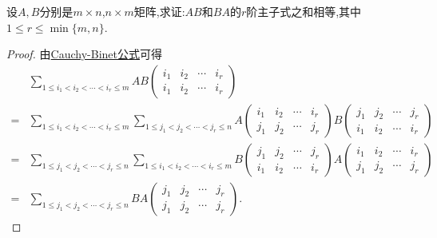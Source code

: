 \documentclass[../../main.tex]{subfiles}%
\begin{document}
\begin{example}
设\(A,B\)分别是\(m\times n\),\(n\times m\)矩阵,求证:\(AB\)和\(BA\)的\(r\)阶主子式之和相等,其中\(1\leqslant  r\leqslant \min\{m,n\}\).
\end{example}
\begin{proof}
由\hyperref[theorem:Cauchy-Binet公式]{Cauchy-Binet公式}可得
\begin{align*}
&\sum_{1\leqslant  i_1 < i_2 < \cdots < i_r\leqslant  m}AB\begin{pmatrix}
i_1 & i_2 & \cdots & i_r\\
i_1 & i_2 & \cdots & i_r
\end{pmatrix}\\
=&\sum_{1\leqslant  i_1 < i_2 < \cdots < i_r\leqslant  m}\sum_{1\leqslant  j_1 < j_2 < \cdots < j_r\leqslant  n}A\begin{pmatrix}
i_1 & i_2 & \cdots & i_r\\
j_1 & j_2 & \cdots & j_r
\end{pmatrix}B\begin{pmatrix}
j_1 & j_2 & \cdots & j_r\\
i_1 & i_2 & \cdots & i_r
\end{pmatrix}\\
=&\sum_{1\leqslant  j_1 < j_2 < \cdots < j_r\leqslant  n}\sum_{1\leqslant  i_1 < i_2 < \cdots < i_r\leqslant  m}B\begin{pmatrix}
j_1 & j_2 & \cdots & j_r\\
i_1 & i_2 & \cdots & i_r
\end{pmatrix}A\begin{pmatrix}
i_1 & i_2 & \cdots & i_r\\
j_1 & j_2 & \cdots & j_r
\end{pmatrix}\\
=&\sum_{1\leqslant  j_1 < j_2 < \cdots < j_r\leqslant  n}BA\begin{pmatrix}
j_1 & j_2 & \cdots & j_r\\
j_1 & j_2 & \cdots & j_r
\end{pmatrix}.
\end{align*}
\end{proof}
\end{document}
